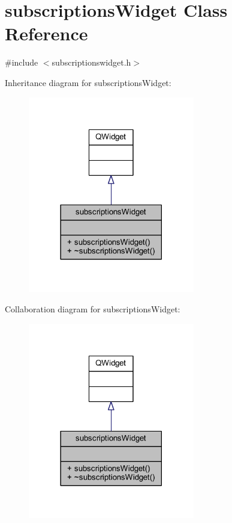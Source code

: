 \hypertarget{classsubscriptions_widget}{}\section{subscriptions\+Widget Class Reference}
\label{classsubscriptions_widget}


{\ttfamily \#include $<$subscriptionswidget.\+h$>$}



Inheritance diagram for subscriptions\+Widget\+:
\nopagebreak
\begin{figure}[H]
\begin{center}
\leavevmode
\includegraphics[width=206pt]{classsubscriptions_widget__inherit__graph}
\end{center}
\end{figure}


Collaboration diagram for subscriptions\+Widget\+:
\nopagebreak
\begin{figure}[H]
\begin{center}
\leavevmode
\includegraphics[width=206pt]{classsubscriptions_widget__coll__graph}
\end{center}
\end{figure}
